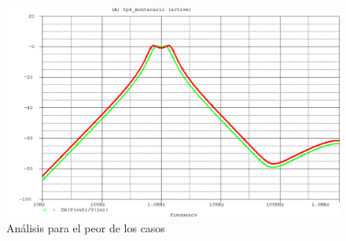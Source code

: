 \documentclass[12pt]{article}
\begin{document}
	\begin{figure}[h!]
		\includegraphics[width=1\linewidth]{Simulaciones_Imagenes/peor_de_los_casos}
		\caption[Análisis para el peor de los casos]{Análisis para el peor de los casos}
		\label{fig:peordeloscasos}
	\end{figure}
	
	
\end{document}
